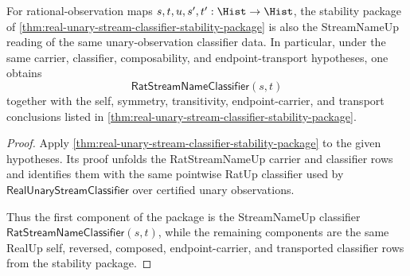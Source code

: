 \begin{theorem}
\label{thm:real-unary-stream-classifier-streamname-stability-package}
For rational-observation maps $s,t,u,s',t':\Hist\to\Hist$, the stability
package of \autoref{thm:real-unary-stream-classifier-stability-package} is
also the StreamNameUp reading of the same unary-observation classifier data.
In particular, under the same carrier, classifier, composability, and
endpoint-transport hypotheses, one obtains
$$
\mathsf{RatStreamNameClassifier}(s,t)
$$
together with the self, symmetry, transitivity, endpoint-carrier, and
transport conclusions listed in
\autoref{thm:real-unary-stream-classifier-stability-package}.
\end{theorem}
\begin{proof}
Apply \autoref{thm:real-unary-stream-classifier-stability-package} to the
given hypotheses. Its proof unfolds the RatStreamNameUp carrier and classifier
rows and identifies them with the same pointwise RatUp classifier used by
$\mathsf{RealUnaryStreamClassifier}$ over certified unary observations.

Thus the first component of the package is the StreamNameUp classifier
$\mathsf{RatStreamNameClassifier}(s,t)$, while the remaining components are
the same RealUp self, reversed, composed, endpoint-carrier, and transported
classifier rows from the stability package.
\end{proof}

